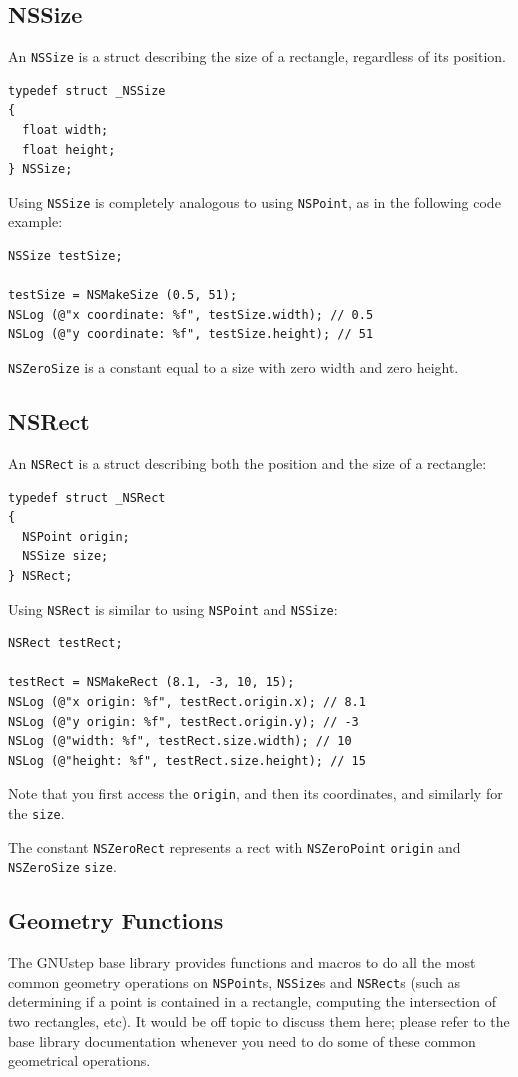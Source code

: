 \documentclass[a4paper]{article}
\begin{document}
\subsection{NSSize}
An \texttt{NSSize} is a struct describing the size of a rectangle,
regardless of its position.
\begin{verbatim}
typedef struct _NSSize
{
  float width;
  float height;
} NSSize;
\end{verbatim}
Using \texttt{NSSize} is completely analogous to using \texttt{NSPoint}, 
as in the following code example: 
\begin{verbatim}
NSSize testSize;

testSize = NSMakeSize (0.5, 51);
NSLog (@"x coordinate: %f", testSize.width); // 0.5
NSLog (@"y coordinate: %f", testSize.height); // 51
\end{verbatim}
\texttt{NSZeroSize} is a constant equal to a size with zero width 
and zero height.

\subsection{NSRect}
An \texttt{NSRect} is a struct describing both the position and the
size of a rectangle:
\begin{verbatim}
typedef struct _NSRect
{
  NSPoint origin;
  NSSize size;
} NSRect;
\end{verbatim}
Using \texttt{NSRect} is similar to using \texttt{NSPoint} and \texttt{NSSize}: 
\begin{verbatim}
NSRect testRect;

testRect = NSMakeRect (8.1, -3, 10, 15);
NSLog (@"x origin: %f", testRect.origin.x); // 8.1
NSLog (@"y origin: %f", testRect.origin.y); // -3
NSLog (@"width: %f", testRect.size.width); // 10
NSLog (@"height: %f", testRect.size.height); // 15
\end{verbatim}
Note that you first access the \texttt{origin}, and then its coordinates, 
and similarly for the \texttt{size}. 

The constant \texttt{NSZeroRect} represents a rect with
\texttt{NSZeroPoint} \texttt{origin} and \texttt{NSZeroSize}
\texttt{size}.

\subsection{Geometry Functions}
The GNUstep base library provides functions and macros to do all the
most common geometry operations on \texttt{NSPoint}s, \texttt{NSSize}s
and \texttt{NSRect}s (such as determining if a point is contained in a
rectangle, computing the intersection of two rectangles, etc).  It
would be off topic to discuss them here; please refer to the base
library documentation whenever you need to do some of these common
geometrical operations.
\end{document}
